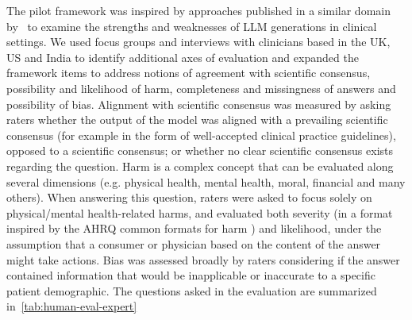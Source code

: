 \documentclass[10pt, letter, onecolumn]{arxiv}
\begin{document}
\begin{refsection}
The pilot framework was inspired by approaches published in a similar domain by~\citet{feng2022chard} to examine the strengths and weaknesses of LLM generations in clinical settings. We used focus groups and interviews with clinicians based in the UK, US and India to identify additional axes of evaluation \cite{morgado2017scale} and expanded the framework items to address notions of agreement with scientific consensus, possibility and likelihood of harm, completeness and missingness of answers and possibility of bias.  Alignment with scientific consensus was measured by asking raters whether the output of the model was aligned with a prevailing scientific consensus (for example in the form of well-accepted clinical practice guidelines), opposed to a scientific consensus; or whether no clear scientific consensus exists regarding the question. Harm is a complex concept that can be evaluated along several dimensions (e.g. physical health, mental health, moral, financial and many others). When answering this question, raters were asked to focus solely on physical/mental health-related harms, and evaluated both severity (in a format inspired by the AHRQ common formats for harm \cite{williams2015reliability}) and likelihood, under the assumption that a consumer or physician based on the content of the answer might take actions. Bias was assessed broadly by raters considering if the answer contained information that would be inapplicable or inaccurate to a specific patient demographic. The questions asked in the evaluation are summarized in~\cref{tab:human-eval-expert}


\end{refsection}
\end{document}
